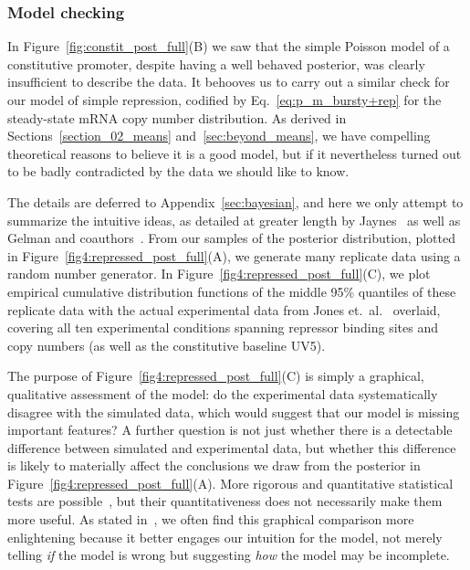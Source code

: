 \subsubsection{Model checking}
In Figure~\ref{fig:constit_post_full}(B) we saw that the simple Poisson model of
a constitutive promoter, despite having a well behaved posterior, was clearly
insufficient to describe the data. It behooves us to carry out a similar check
for our model of simple repression, codified by Eq.~\ref{eq:p_m_bursty+rep} for
the steady-state mRNA copy number distribution. As derived in
Sections~\ref{section_02_means} and~\ref{sec:beyond_means}, we have compelling
theoretical reasons to believe it is a good model, but if it nevertheless turned
out to be badly contradicted by the data we should like to know.

The details are deferred to Appendix~\ref{sec:bayesian}, and here we only
attempt to summarize the intuitive ideas, as detailed at greater length by
Jaynes~\cite{Jaynes2003} as well as Gelman and
coauthors~\cite{Gelman2013,Gelman2013a}. From our samples of the posterior
distribution, plotted in Figure~\ref{fig4:repressed_post_full}(A), we generate
many replicate data using a random number generator. In
Figure~\ref{fig4:repressed_post_full}(C), we plot empirical cumulative
distribution functions of the middle 95\% quantiles of these replicate data with
the actual experimental data from Jones et.\ al.~\cite{Jones2014} overlaid,
covering all ten experimental conditions spanning repressor binding sites and
copy numbers (as well as the constitutive baseline UV5).

The purpose of Figure~\ref{fig4:repressed_post_full}(C) is simply a graphical,
qualitative assessment of the model: do the experimental data systematically
disagree with the simulated data, which would suggest that our model is missing
important features? A further question is not just whether there is a detectable
difference between simulated and experimental data, but whether this difference
is likely to materially affect the conclusions we draw from the posterior in
Figure~\ref{fig4:repressed_post_full}(A). More rigorous and quantitative
statistical tests are possible~\cite{Gelman2013}, but their quantitativeness
does not necessarily make them more useful. As stated in~\cite{Gelman2013a}, we
often find this graphical comparison more enlightening because it better engages
our intuition for the model, not merely telling \textit{if} the model is wrong
but suggesting \textit{how} the model may be incomplete.

